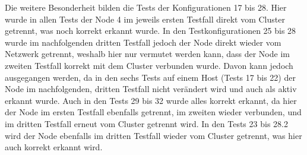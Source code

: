 Die weitere Besonderheit bilden die Tests der Konfigurationen 17 bis 28.
Hier wurde in allen Tests der Node 4 im jeweils ersten Testfall direkt vom Cluster getrennt, was noch korrekt erkannt wurde.
In den Testkonfigurationen 25 bis 28 wurde im nachfolgenden dritten Testfall jedoch der Node direkt wieder vom Netzwerk getrennt, weshalb hier nur vermutet werden kann, dass der Node im zweiten Testfall korrekt mit dem Cluster verbunden wurde.
Davon kann jedoch ausgegangen werden, da in den sechs Tests auf einem Host (Tests 17 bis 22) der Node im nachfolgenden, dritten Testfall nicht verändert wird und auch als aktiv erkannt wurde.
Auch in den Tests 29 bis 32 wurde alles korrekt erkannt, da hier der Node im ersten Testfall ebenfalls getrennt, im zweiten wieder verbunden, und im dritten Testfall erneut vom Cluster getrennt wird.
In den Tests 23 bis 28.2 wird der Node ebenfalls im dritten Testfall wieder vom Cluster getrennt, was hier auch korrekt erkannt wird.
